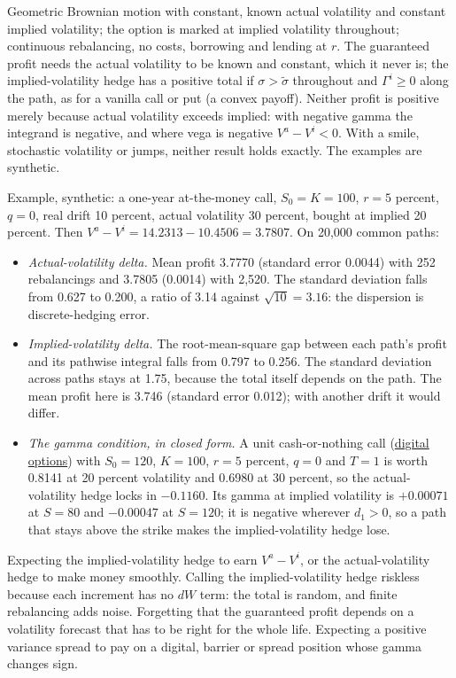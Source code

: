 \begin{qfresult}
 Geometric Brownian motion with constant, known actual volatility and constant implied volatility; the option is marked at implied volatility throughout; continuous rebalancing, no costs, borrowing and lending at $r$. The guaranteed profit needs the actual volatility to be known and constant, which it never is; the implied-volatility hedge has a positive total if $\sigma>\tilde\sigma$ throughout and $\Gamma^i\ge0$ along the path, as for a vanilla call or put (a convex payoff). Neither profit is positive merely because actual volatility exceeds implied: with negative gamma the integrand is negative, and where vega is negative $V^a-V^i<0$. With a smile, stochastic volatility or jumps, neither result holds exactly. The examples are synthetic.

 Example, synthetic: a one-year at-the-money call, $S_0=K=100$, $r=5$ percent, $q=0$, real drift 10 percent, actual volatility 30 percent, bought at implied 20 percent. Then $V^a-V^i=14.2313-10.4506=3.7807$. On 20{,}000 common paths:
\begin{itemize}
\item \emph{Actual-volatility delta.} Mean profit 3.7770 (standard error 0.0044) with 252 rebalancings and 3.7805 (0.0014) with 2{,}520. The standard deviation falls from 0.627 to 0.200, a ratio of 3.14 against $\sqrt{10}=3.16$: the dispersion is discrete-hedging error.
\item \emph{Implied-volatility delta.} The root-mean-square gap between each path's profit and its pathwise integral falls from 0.797 to 0.256. The standard deviation across paths stays at 1.75, because the total itself depends on the path. The mean profit here is 3.746 (standard error 0.012); with another drift it would differ.
\item \emph{The gamma condition, in closed form.} A unit cash-or-nothing call (\hyperref[meth:digital-option-valuation]{digital options}) with $S_0=120$, $K=100$, $r=5$ percent, $q=0$ and $T=1$ is worth 0.8141 at 20 percent volatility and 0.6980 at 30 percent, so the actual-volatility hedge locks in $-0.1160$. Its gamma at implied volatility is $+0.00071$ at $S=80$ and $-0.00047$ at $S=120$; it is negative wherever $d_1>0$, so a path that stays above the strike makes the implied-volatility hedge lose.
\end{itemize}

 Expecting the implied-volatility hedge to earn $V^a-V^i$, or the actual-volatility hedge to make money smoothly. Calling the implied-volatility hedge riskless because each increment has no $dW$ term: the total is random, and finite rebalancing adds noise. Forgetting that the guaranteed profit depends on a volatility forecast that has to be right for the whole life. Expecting a positive variance spread to pay on a digital, barrier or spread position whose gamma changes sign.


\end{qfresult}
